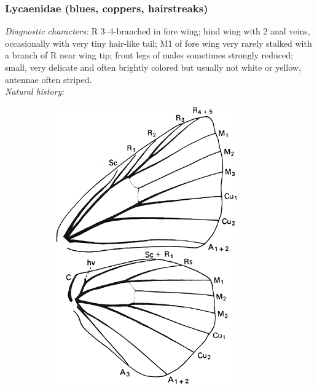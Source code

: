 \documentclass[letterpaper, 11pt]{article}
\begin{document}
\subsubsection{Lycaenidae (blues, coppers, hairstreaks)}
\noindent{}\textit{Diagnostic characters:} R 3--4-branched in fore wing; hind wing with 2 anal veins, occasionally with very tiny hair-like tail; M1 of fore wing very rarely stalked with a branch of R near wing tip; front legs of males sometimes strongly reduced; small, very delicate and often brightly colored but usually not white or yellow, antennae often striped.\\

\noindent{}\textit{Natural history:} 

\begin{figure}[ht!]
    \centering
    \begin{subfigure}[ht!]{0.28\textwidth}
        \includegraphics[width=\textwidth]{image13}

\end{subfigure}
\end{figure}
\end{document}
